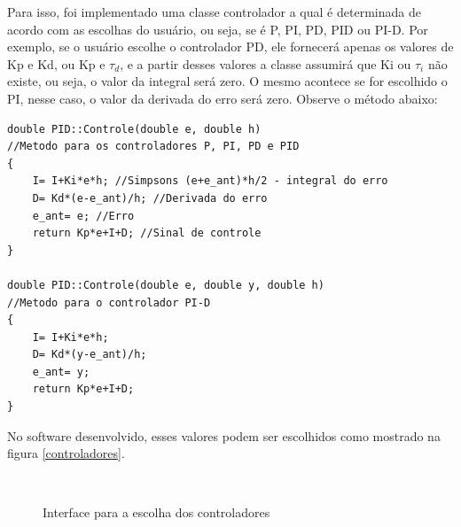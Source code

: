 \documentclass[a4paper,12pt]{article}
\begin{document}
\hspace{4ex}Para isso, foi implementado uma classe controlador a qual é determinada de acordo com as escolhas do usuário, ou seja, se é P, PI, PD, PID ou PI-D. Por exemplo, se o usuário escolhe o controlador PD, ele fornecerá apenas os valores de Kp e Kd, ou Kp e $\tau_d$, e a partir desses valores a classe assumirá que Ki ou $\tau_i$ não existe, ou seja, o valor da integral será zero. O mesmo acontece se for escolhido o PI, nesse caso, o valor da derivada do erro será zero. Observe o método abaixo:
\\
\begin{lstlisting}
double PID::Controle(double e, double h)
//Metodo para os controladores P, PI, PD e PID
{
    I= I+Ki*e*h; //Simpsons (e+e_ant)*h/2 - integral do erro
    D= Kd*(e-e_ant)/h; //Derivada do erro
    e_ant= e; //Erro
    return Kp*e+I+D; //Sinal de controle
}

double PID::Controle(double e, double y, double h)
//Metodo para o controlador PI-D
{
    I= I+Ki*e*h;
    D= Kd*(y-e_ant)/h;
    e_ant= y;
    return Kp*e+I+D;
}
\end{lstlisting}

\hspace{4ex}No software desenvolvido, esses valores podem ser escolhidos como mostrado na figura \ref{controladores}.

\begin{figure}[H]
     \centering
     \hspace{4ex}
     \\
     \caption{Interface para a escolha dos controladores}
     \label{fig:controladores}
\end{figure}
\end{document}
